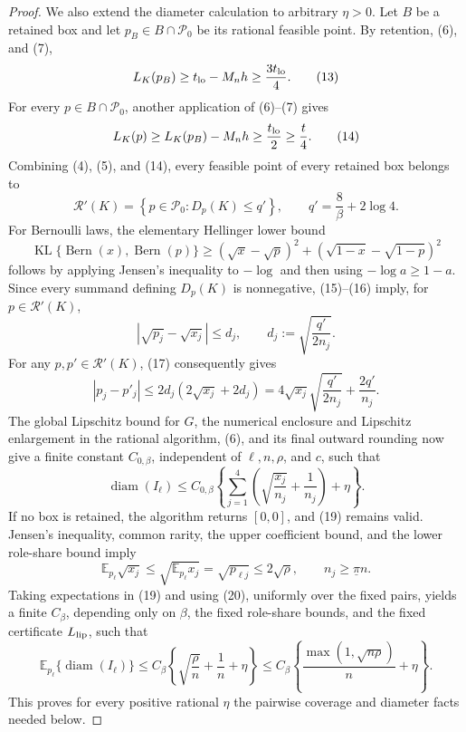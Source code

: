\documentclass{article}
\begin{document}
\begin{proof}
We also extend the diameter calculation to arbitrary \(\eta>0\).  Let \(B\) be a retained box and let \(p_B\in B\cap\mathcal P_0\) be its rational feasible point.  By retention, (6), and (7),
\[
L_K(p_B)\geq t_{\rm lo}-M_nh\geq\frac{3t_{\rm lo}}4.
\tag{13}
\]
For every \(p\in B\cap\mathcal P_0\), another application of (6)--(7) gives
\[
L_K(p)\geq L_K(p_B)-M_nh
\geq\frac{t_{\rm lo}}2
\geq\frac t4.
\tag{14}
\]
Combining (4), (5), and (14), every feasible point of every retained box belongs to
\[
\mathcal R'(K)
=\left\{p\in\mathcal P_0:D_p(K)\leq q'\right\},
\qquad
q'=\frac8\beta+2\log4.
\tag{15}
\]
For Bernoulli laws, the elementary Hellinger lower bound
\[
\operatorname{KL}\{\operatorname{Bern}(x),\operatorname{Bern}(p)\}
\geq(\sqrt{x}-\sqrt{p})^2
+(\sqrt{1-x}-\sqrt{1-p})^2
\tag{16}
\]
follows by applying Jensen's inequality to \(-\log\) and then using \(-\log a\geq1-a\).  Since every summand defining \(D_p(K)\) is nonnegative, (15)--(16) imply, for \(p\in\mathcal R'(K)\),
\[
|\sqrt{p_j}-\sqrt{x_j}|
\leq d_j,
\qquad
d_j:=\sqrt{\frac{q'}{2n_j}}.
\tag{17}
\]
For any \(p,p'\in\mathcal R'(K)\), (17) consequently gives
\[
|p_j-p'_j|
\leq2d_j(2\sqrt{x_j}+2d_j)
=4\sqrt{x_j}\sqrt{\frac{q'}{2n_j}}+\frac{2q'}{n_j}.
\tag{18}
\]
The global Lipschitz bound for \(G\), the numerical enclosure and Lipschitz enlargement in the rational algorithm, (6), and its final outward rounding now give a finite constant \(C_{0,\beta}\), independent of \(\ell,n,\rho\), and \(c\), such that
\[
\operatorname{diam}(I_\ell)
\leq C_{0,\beta}
\left\{
\sum_{j=1}^4\left(\sqrt{\frac{x_j}{n_j}}+\frac1{n_j}\right)+\eta
\right\}.
\tag{19}
\]
If no box is retained, the algorithm returns \([0,0]\), and (19) remains valid.  Jensen's inequality, common rarity, the upper coefficient bound, and the lower role-share bound imply
\[
\mathbb E_{p_\ell}\sqrt{x_j}
\leq\sqrt{\mathbb E_{p_\ell}x_j}
=\sqrt{p_{\ell j}}
\leq2\sqrt\rho,
\qquad
n_j\geq\underline\pi n.
\tag{20}
\]
Taking expectations in (19) and using (20), uniformly over the fixed pairs, yields a finite \(C_\beta\), depending only on \(\beta\), the fixed role-share bounds, and the fixed certificate \(L_{\rm lip}\), such that
\[
\mathbb E_{p_\ell}\{\operatorname{diam}(I_\ell)\}
\leq C_\beta\left\{\sqrt{\frac\rho n}+\frac1n+\eta\right\}
\leq C_\beta\left\{\frac{\max(1,\sqrt{n\rho})}{n}+\eta\right\}.
\tag{21}
\]
This proves for every positive rational \(\eta\) the pairwise coverage and diameter facts needed below.


\end{proof}
\end{document}
